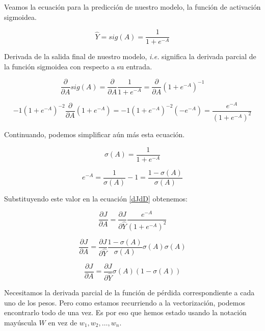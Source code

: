 \documentclass[a4paper,12pt]{article}
\begin{document}
Veamos la ecuación para la predicción de nuestro modelo, la función de activación sigmoidea.

\begin{equation}
\hat{Y} = sig(A) = \frac{1}{1+e^{-A}}
\end{equation}

Derivada de la salida final de nuestro modelo, \textit{i.e.} significa la derivada parcial de la función sigmoidea con respecto a su entrada.

\begin{equation}
\frac{\partial}{\partial A} sig(A) = \frac{\partial}{\partial A} \frac{1}{1+e^{-A}} = \frac{\partial}{\partial A} (1+e^{-A})^{-1}
\end{equation}

\begin{equation}
 -1  (1+e^{-A})^{-2} \frac{\partial}{\partial A} (1+e^{-A}) = -1  (1+e^{-A})^{-2} (-e^{-A}) = \frac{e^{-A}}{(1+e^{-A})^2}
\end{equation}

Continuando, podemos simplificar aún más esta ecuación.

\begin{equation}
\sigma(A) = \frac{1}{1+e^{-A}}
\end{equation}

\begin{equation}
e^{-A} = \frac{1}{\sigma(A)} - 1 = \frac{1-\sigma(A)}{\sigma(A)}
\end{equation}

Substituyendo este valor en la ecuación \ref{dJdD} obtenemos:

\begin{equation}
\frac{\partial J}{\partial A} = \frac{\partial J}{\partial \hat{Y}} \frac{e^{-A}}{(1+e^{-A})^2}
\end{equation}

\begin{equation}
\frac{\partial J}{\partial A} = \frac{\partial J} {\partial \hat{Y} } \frac{1-\sigma(A)}{\sigma(A)} \sigma(A) \sigma(A)
\end{equation}

\begin{equation}
\frac{\partial J}{\partial A} = \frac{\partial J} {\partial \hat{Y}} \sigma(A) (1-\sigma(A))
\end{equation}

Necesitamos la derivada parcial de la función de pérdida correspondiente a cada uno de los pesos. Pero como estamos recurriendo a la vectorización, podemos encontrarlo todo de una vez. Es por eso que hemos estado usando la notación mayúscula $W$ en vez de $w_1, w_2, \ldots, w_n$.
\end{document}
